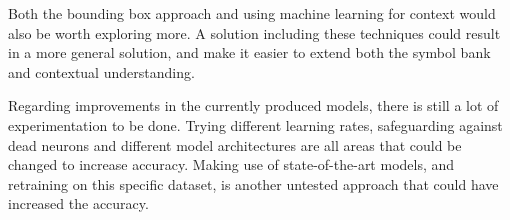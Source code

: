 Both the bounding box approach and using machine learning for context would also be worth exploring more. A solution including these techniques could result in a more general solution, and make it easier to extend both the symbol bank and contextual understanding.

Regarding improvements in the currently produced models, there is still a lot of experimentation to be done. Trying different learning rates, safeguarding against dead neurons and different model architectures are all areas that could be changed to increase accuracy. Making use of state-of-the-art models, and retraining on this specific dataset, is another untested approach that could have increased the accuracy. 
